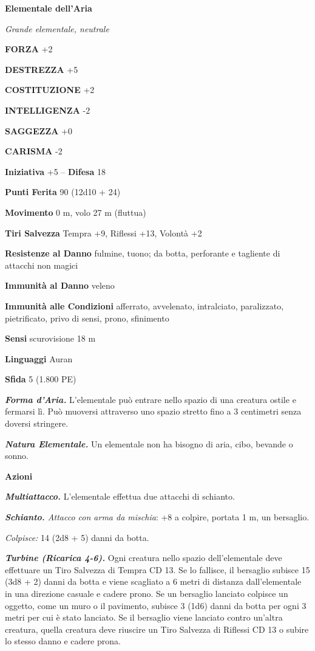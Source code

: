 \begin{multicols}{2}
\medskip{}\textbf{Elementale dell'Aria}

\emph{Grande elementale, neutrale}

\textbf{FORZA} +2

\textbf{DESTREZZA} +5

\textbf{COSTITUZIONE} +2

\textbf{INTELLIGENZA} -2

\textbf{SAGGEZZA} +0

\textbf{CARISMA} -2

\textbf{Iniziativa} +5 -- \textbf{Difesa} 18

\textbf{Punti Ferita} 90 (12d10 + 24)

\textbf{Movimento} 0 m, volo 27 m (fluttua)

\textbf{Tiri Salvezza} Tempra +9, Riflessi +13, Volontà +2

\textbf{Resistenze al Danno} fulmine, tuono; da botta, perforante e tagliente di attacchi non magici

\textbf{Immunità al Danno} veleno

\textbf{Immunità alle Condizioni} afferrato, avvelenato, intralciato, paralizzato, pietrificato, privo di sensi, prono, sfinimento

\textbf{Sensi} scurovisione 18 m

\textbf{Linguaggi} Auran

\textbf{Sfida} 5 (1.800 PE)

\emph{\textbf{Forma d'Aria.}} L'elementale può entrare nello spazio di una creatura ostile e fermarsi lì. Può muoversi attraverso uno spazio stretto fino a 3 centimetri senza doversi stringere.

\emph{\textbf{Natura Elementale.}} Un elementale non ha bisogno di aria, cibo, bevande o sonno.

\textbf{Azioni}

\emph{\textbf{Multiattacco.}} L'elementale effettua due attacchi di schianto.

\emph{\textbf{Schianto.} Attacco con arma da mischia}: +8 a colpire, portata 1 m, un bersaglio.

\emph{Colpisce:} 14 (2d8 + 5) danni da botta.

\emph{\textbf{Turbine (Ricarica 4-6).}} Ogni creatura nello spazio dell'elementale deve effettuare un Tiro Salvezza di Tempra CD 13. Se lo fallisce, il bersaglio subisce 15 (3d8 + 2) danni da botta e viene scagliato a 6 metri di distanza dall'elementale in una direzione casuale e cadere prono. Se un bersaglio lanciato colpisce un oggetto, come un muro o il pavimento, subisce 3 (1d6) danni da botta per ogni 3 metri per cui è stato lanciato. Se il bersaglio viene lanciato contro un'altra creatura, quella creatura deve riuscire un Tiro Salvezza di Riflessi CD 13 o subire lo stesso danno e cadere prona.


\end{multicols}
